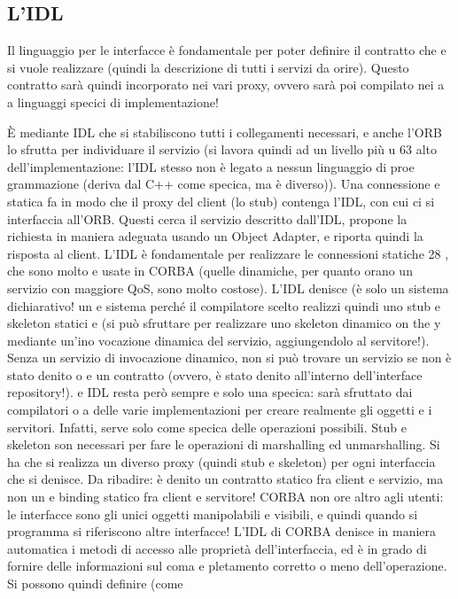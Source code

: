 \documentclass[a4paper,12pt]{article}
\begin{document}
\subsection{L'IDL}
Il linguaggio per le interfacce è fondamentale per poter definire il contratto che
e
si vuole realizzare (quindi la descrizione di tutti i servizi da orire). Questo
contratto sarà quindi incorporato nei vari proxy, ovvero sarà poi compilato nei
a
a
linguaggi specici di implementazione!

È mediante IDL che si stabiliscono tutti i collegamenti necessari, e anche
l'ORB lo sfrutta per individuare il servizio (si lavora quindi ad un livello più
u
63
alto dell'implementazione: l'IDL stesso non è legato a nessun linguaggio di proe
grammazione (deriva dal C++ come specica, ma è diverso)). Una connessione
e
statica fa in modo che il proxy del client (lo stub) contenga l'IDL, con cui ci
si interfaccia all'ORB. Questi cerca il servizio descritto dall'IDL, propone la
richiesta in maniera adeguata usando un Object Adapter, e riporta quindi la
risposta al client.
L'IDL è fondamentale per realizzare le connessioni statiche 28 , che sono molto
e
usate in CORBA (quelle dinamiche, per quanto orano un servizio con maggiore
QoS, sono molto costose). L'IDL denisce (è solo un sistema dichiarativo! un
e
sistema perché il compilatore scelto realizzi quindi uno stub e skeleton statici
e
(si può sfruttare per realizzare uno skeleton dinamico on the y mediante un'ino
vocazione dinamica del servizio, aggiungendolo al servitore!). Senza un servizio
di invocazione dinamico, non si può trovare un servizio se non è stato denito
o
e
un contratto (ovvero, è stato denito all'interno dell'interface repository!).
e
IDL resta però sempre e solo una specica: sarà sfruttato dai compilatori
o
a
delle varie implementazioni per creare realmente gli oggetti e i servitori. Infatti,
serve solo come specica delle operazioni possibili.
Stub e skeleton son necessari per fare le operazioni di marshalling ed unmarshalling. Si ha che si realizza un diverso
proxy (quindi stub e skeleton) per ogni
interfaccia che si denisce.
Da ribadire: è denito un contratto statico fra client e servizio, ma non un
e
binding statico fra client e servitore!
CORBA non ore altro agli utenti: le interfacce sono gli unici oggetti manipolabili e visibili, e quindi quando si
programma si riferiscono altre interfacce!
L'IDL di CORBA denisce in maniera automatica i metodi di accesso alle
proprietà dell'interfaccia, ed è in grado di fornire delle informazioni sul coma
e
pletamento corretto o meno dell'operazione. Si possono quindi definire (come
\end{document}
